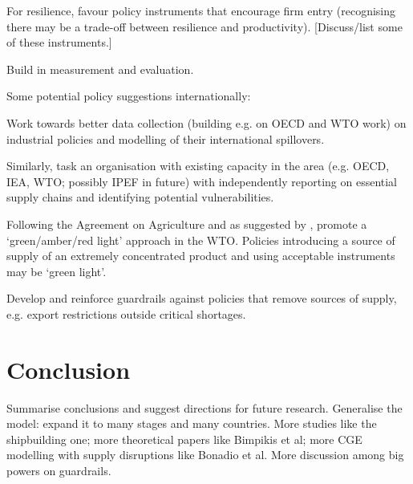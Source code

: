 \documentclass{article}
\begin{document}
For resilience, favour policy instruments that encourage firm entry (recognising there may be a trade-off between resilience and productivity). [Discuss/list some of these instruments.] 

Build in measurement and evaluation.  

Some potential policy suggestions internationally:  

Work towards better data collection (building e.g. on OECD and WTO work) on industrial policies and modelling of their international spillovers. 

Similarly, task an organisation with existing capacity in the area (e.g. OECD, IEA, WTO; possibly IPEF in future) with independently reporting on essential supply chains and identifying potential vulnerabilities.  

Following the Agreement on Agriculture and as suggested by \textcite{bown_wtoing_2019}, promote a ‘green/amber/red light’ approach in the WTO. Policies introducing a source of supply of an extremely concentrated product and using acceptable instruments may be ‘green light’. 

Develop and reinforce guardrails against policies that remove sources of supply, e.g. export restrictions outside critical shortages.

\section{Conclusion}

Summarise conclusions and suggest directions for future research. Generalise the model: expand it to many stages and many countries. More studies like the shipbuilding one; more theoretical papers like Bimpikis et al; more CGE modelling with supply disruptions like Bonadio et al. More discussion among big powers on guardrails.

\printbibliography
\end{document}
